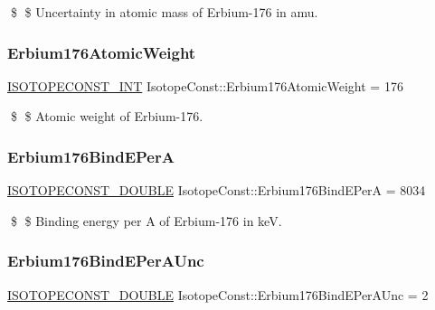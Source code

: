 \$ \$ Uncertainty in atomic mass of Erbium-\/176 in amu. \mbox{\label{group___isotope_const-_erbium-_er176_ga7775eb833d69447cbf0496e5a375eaee}} 
\subsubsection{\texorpdfstring{Erbium176\+Atomic\+Weight}{Erbium176AtomicWeight}}
{\footnotesize\ttfamily \mbox{\hyperlink{group___isotope_const-_macros_ga5f18360b3e99483a35c32d789e62621c}{I\+S\+O\+T\+O\+P\+E\+C\+O\+N\+S\+T\+\_\+\+I\+NT}} Isotope\+Const\+::\+Erbium176\+Atomic\+Weight = 176}

\$ \$ Atomic weight of Erbium-\/176. \mbox{\label{group___isotope_const-_erbium-_er176_ga0be16548b4545a28134006268dac8d01}} 
\subsubsection{\texorpdfstring{Erbium176\+Bind\+E\+PerA}{Erbium176BindEPerA}}
{\footnotesize\ttfamily \mbox{\hyperlink{group___isotope_const-_macros_ga8f45a7272ce02c0b4c65c44636ed719a}{I\+S\+O\+T\+O\+P\+E\+C\+O\+N\+S\+T\+\_\+\+D\+O\+U\+B\+LE}} Isotope\+Const\+::\+Erbium176\+Bind\+E\+PerA = 8034}

\$ \$ Binding energy per A of Erbium-\/176 in keV. \mbox{\label{group___isotope_const-_erbium-_er176_ga2dfbe9cff49b83b13cb7835e61c4e266}} 
\subsubsection{\texorpdfstring{Erbium176\+Bind\+E\+Per\+A\+Unc}{Erbium176BindEPerAUnc}}
{\footnotesize\ttfamily \mbox{\hyperlink{group___isotope_const-_macros_ga8f45a7272ce02c0b4c65c44636ed719a}{I\+S\+O\+T\+O\+P\+E\+C\+O\+N\+S\+T\+\_\+\+D\+O\+U\+B\+LE}} Isotope\+Const\+::\+Erbium176\+Bind\+E\+Per\+A\+Unc = 2}

